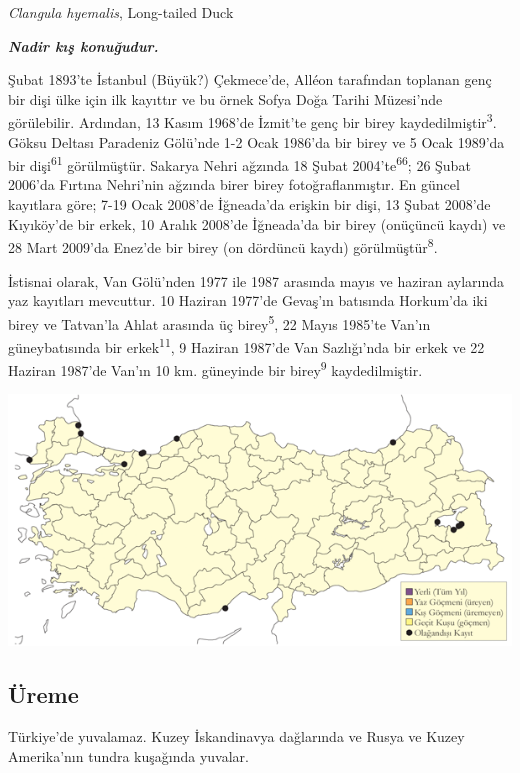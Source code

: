 \documentclass[
  letterpaper,
  DIV=11,
  numbers=noendperiod]{scrreprt}
\begin{document}
\emph{Clangula hyemalis}, Long-tailed Duck

\textbf{\emph{Nadir kış konuğudur.}}

Şubat 1893'te İstanbul (Büyük?) Çekmece'de, Alléon tarafından toplanan
genç bir dişi ülke için ilk kayıttır ve bu örnek Sofya Doğa Tarihi
Müzesi'nde görülebilir. Ardından, 13 Kasım 1968'de İzmit'te genç bir
birey kaydedilmiştir\textsuperscript{3}. Göksu Deltası Paradeniz
Gölü'nde 1-2 Ocak 1986'da bir birey ve 5 Ocak 1989'da bir
dişi\textsuperscript{61} görülmüştür. Sakarya Nehri ağzında 18 Şubat
2004'te\textsuperscript{66}; 26 Şubat 2006'da Fırtına Nehri'nin ağzında
birer birey fotoğraflanmıştır. En güncel kayıtlara göre; 7-19 Ocak
2008'de İğneada'da erişkin bir dişi, 13 Şubat 2008'de Kıyıköy'de bir
erkek, 10 Aralık 2008'de İğneada'da bir birey (onüçüncü kaydı) ve 28
Mart 2009'da Enez'de bir birey (on dördüncü kaydı)
görülmüştür\textsuperscript{8}.

İstisnai olarak, Van Gölü'nden 1977 ile 1987 arasında mayıs ve haziran
aylarında yaz kayıtları mevcuttur. 10 Haziran 1977'de Gevaş'ın batısında
Horkum'da iki birey ve Tatvan'la Ahlat arasında üç
birey\textsuperscript{5}, 22 Mayıs 1985'te Van'ın güneybatısında bir
erkek\textsuperscript{11}, 9 Haziran 1987'de Van Sazlığı'nda bir erkek
ve 22 Haziran 1987'de Van'ın 10 km. güneyinde bir
birey\textsuperscript{9} kaydedilmiştir.

\includegraphics{images/harita_Page_030.png}

\hypertarget{uxfcreme-29}{%
\subsection{\texorpdfstring{\textbf{Üreme}}{Üreme}}\label{uxfcreme-29}}

Türkiye'de yuvalamaz. Kuzey İskandinavya dağlarında ve Rusya ve Kuzey
Amerika'nın tundra kuşağında yuvalar.
\end{document}
